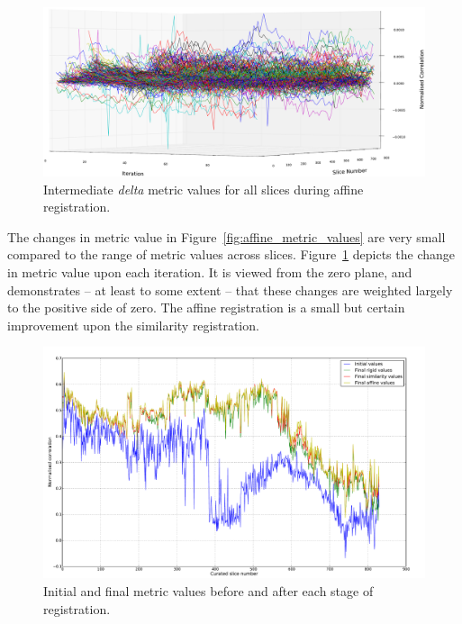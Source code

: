   \begin{figure}
    \centering
    \includegraphics[width=\textheight]{Ch5/Figs/diagnostics/affine_metric_value_differences}
    \caption{Intermediate \emph{delta} metric values for all slices during affine registration.}
    \label{fig:affine_metric_value_differences}
  \end{figure}
  
	The changes in metric value in Figure~\ref{fig:affine_metric_values} are very small compared to the range of metric values across slices. Figure~\ref{fig:affine_metric_value_differences} depicts the change in metric value upon each iteration. It is viewed from the zero plane, and demonstrates -- at least to some extent -- that these changes are weighted largely to the positive side of zero. The affine registration is a small but certain improvement upon the similarity registration.
	
  \begin{figure}
    \centering
    \includegraphics[width=\textheight]{Ch5/Figs/diagnostics/initial_and_final_values_comparison}
    \caption{Initial and final metric values before and after each stage of registration.}
    \label{fig:initial_and_final_values_comparison}
  \end{figure}
  
